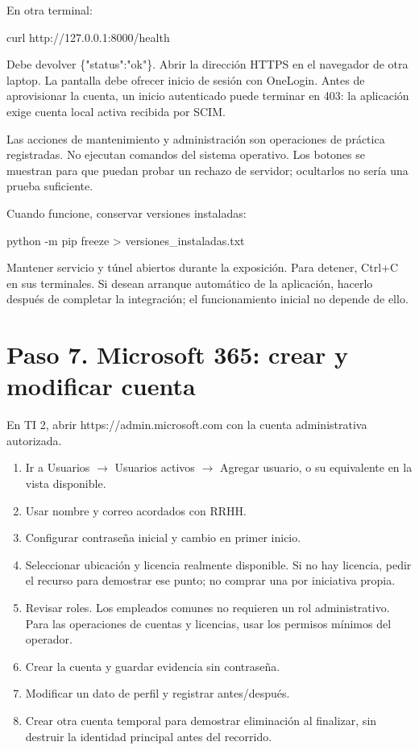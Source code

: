 \documentclass[12pt,a4paper]{article}
\begin{document}
En otra terminal:\par
{}
\begin{Comandos}
curl http://127.0.0.1:8000/health
\end{Comandos}
Debe devolver \textnormal{\{"status":"ok"\}}. Abrir la dirección HTTPS en el navegador de otra laptop. La pantalla debe ofrecer inicio de sesión con OneLogin. Antes de aprovisionar la cuenta, un inicio autenticado puede terminar en 403: la aplicación exige cuenta local activa recibida por SCIM.\par
Las acciones de mantenimiento y administración son operaciones de práctica registradas. No ejecutan comandos del sistema operativo. Los botones se muestran para que puedan probar un rechazo de servidor; ocultarlos no sería una prueba suficiente.\par
Cuando funcione, conservar versiones instaladas:\par
{}
\begin{Comandos}
python -m pip freeze > versiones_instaladas.txt
\end{Comandos}
Mantener servicio y túnel abiertos durante la exposición. Para detener, Ctrl+C en sus terminales. Si desean arranque automático de la aplicación, hacerlo después de completar la integración; el funcionamiento inicial no depende de ello.\par
{}\section*{Paso 7. Microsoft 365: crear y modificar cuenta}
En TI 2, abrir \textnormal{https:/\allowbreak{}/\allowbreak{}admin.microsoft.com} con la cuenta administrativa autorizada.\par
\begin{enumerate}
\item Ir a Usuarios \(\rightarrow\) Usuarios activos \(\rightarrow\) Agregar usuario, o su equivalente en la vista disponible.
\item Usar nombre y correo acordados con RRHH.
\item Configurar contraseña inicial y cambio en primer inicio.
\item Seleccionar ubicación y licencia realmente disponible. Si no hay licencia, pedir el recurso para demostrar ese punto; no comprar una por iniciativa propia.
\item Revisar roles. Los empleados comunes no requieren un rol administrativo. Para las operaciones de cuentas y licencias, usar los permisos mínimos del operador.
\item Crear la cuenta y guardar evidencia sin contraseña.
\item Modificar un dato de perfil y registrar antes/después.
\item Crear otra cuenta temporal para demostrar eliminación al finalizar, sin destruir la identidad principal antes del recorrido.
\end{enumerate}
\end{document}
